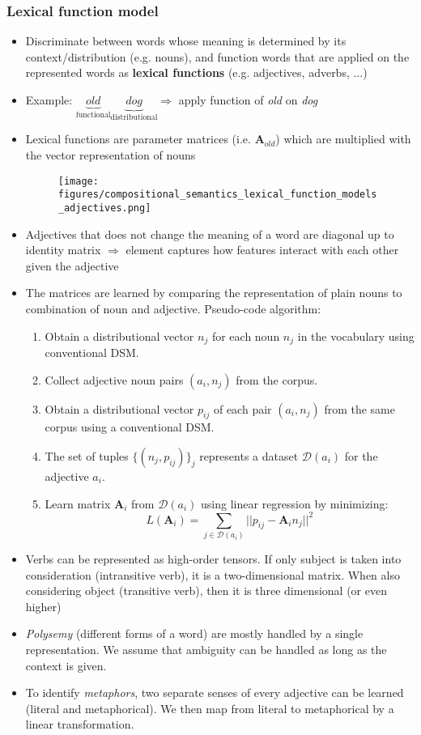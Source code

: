\subsubsection{Lexical function model}
\begin{itemize}
	\item Discriminate between words whose meaning is determined by its context/distribution (e.g. nouns), and function words that are applied on the represented words as \textbf{lexical functions} (e.g. adjectives, adverbs, ...)
	\item Example: $\underbrace{\textit{old}}_{\text{functional}} \underbrace{\textit{dog}}_{\text{distributional}} \Rightarrow$ apply function of \textit{old} on \textit{dog}
	\item Lexical functions are parameter matrices (i.e. $\bm{A}_{\textit{old}}$) which are multiplied with the vector representation of nouns
	\begin{figure}[ht]
		\centering
		\texttt{[image: figures/compositional\_semantics\_lexical\_function\_models\_adjectives.png]}
	\end{figure}
	\item Adjectives that does not change the meaning of a word are diagonal up to identity matrix $\Rightarrow$ element captures how features interact with each other given the adjective
	\item The matrices are learned by comparing the representation of plain nouns to combination of noun and adjective. Pseudo-code algorithm:
	\begin{enumerate}
		\item Obtain a distributional vector $n_j$ for each noun $n_j$ in the vocabulary using conventional DSM.
		\item Collect adjective noun pairs $(a_i,n_j)$ from the corpus.
		\item Obtain a distributional vector $p_{ij}$ of each pair $(a_i,n_j)$ from the same corpus using a conventional DSM.
		\item The set of tuples $\{(n_j,p_{ij})\}_j$ represents a dataset $\mathcal{D}(a_i)$ for the adjective $a_i$.
		\item Learn matrix $\bm{A}_i$ from $\mathcal{D}(a_i)$ using linear regression by minimizing:
		$$L(\bm{A}_i) = \sum\limits_{j\in \mathcal{D}(a_i)} ||p_{ij} - \bm{A}_i n_j||^2$$
	\end{enumerate} 
	\item Verbs can be represented as high-order tensors. If only subject is taken into consideration (intransitive verb), it is a two-dimensional matrix. When also considering object (transitive verb), then it is three dimensional (or even higher)
	\item \textit{Polysemy} (different forms of a word) are mostly handled by a single representation. We assume that ambiguity can be handled as long as the context is given.
	\item To identify \textit{metaphors}, two separate senses of every adjective can be learned (literal and metaphorical). We then map from literal to metaphorical by a linear transformation. 
\end{itemize}
